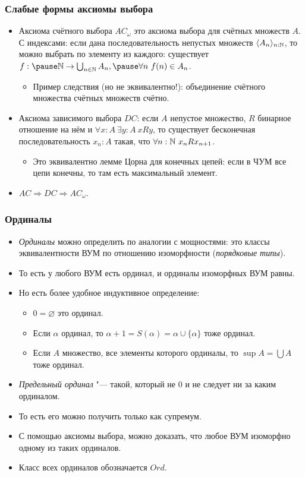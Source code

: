 \documentclass[10pt]{beamer}
\begin{document}
\begin{frame}
    \frametitle{Слабые формы аксиомы выбора}
    \begin{itemize}
        \item Аксиома счётного выбора $AC_\omega$ это аксиома выбора для счётных множеств $A$. С индексами: если дана последовательность непустых множеств $\langle A_n \rangle_{n : \mathbb{N}}$, то можно выбрать по элементу из каждого: существует $f:\pause \N \to \bigcup_{n \in \N} A_n, \pause\forall n~f(n) \in A_n$.
        \begin{itemize}
            \item Пример следствия (но не эквивалентно!): объединение счётного множества счётных множеств счётно.
        \end{itemize}
        \pause
        \item Аксиома зависимого выбора $DC$: если $A$ непустое множество, $R$ бинарное отношение на нём и $\forall x:A~\exists y:A~xRy$, то существует бесконечная последовательность $x_n:A$ такая, что $\forall n:\mathbb{N}~x_nRx_{n+1}$.
        \begin{itemize}
            \item Это эквивалентно лемме Цорна для конечных цепей: если в ЧУМ все цепи конечны, то там есть максимальный элемент.
        \end{itemize}
        \pause
        \item $AC \Rightarrow DC \Rightarrow AC_\omega$.
    \end{itemize}
\end{frame}

\begin{frame}
    \frametitle{Ординалы}
    \begin{itemize}
        \item \emph{Ординалы} можно определить по аналогии с мощностями: это классы эквивалентности ВУМ по отношению изоморфности (\emph{порядковые типы}).
        \item То есть у любого ВУМ есть ординал, и ординалы изоморфных ВУМ равны.
        \item Но есть более удобное индуктивное определение:
        \begin{itemize}
            \item $0 = \varnothing$ это ординал.
            \item Если $\alpha$ ординал, то $\alpha + 1 = S(\alpha) = \alpha \cup \{\alpha\}$ тоже ординал.
            \item Если $A$ множество, все элементы которого ординалы, то $\sup A = \bigcup A$ тоже ординал.
        \end{itemize}
        \item \emph{Предельный ординал} "--- такой, который не $0$ и не следует ни за каким ординалом.
        \item То есть его можно получить только как супремум.
        \item С помощью аксиомы выбора, можно доказать, что любое ВУМ изоморфно одному из таких ординалов.
        \item Класс всех ординалов обозначается $Ord$.
    \end{itemize}
\end{frame}
\end{document}
